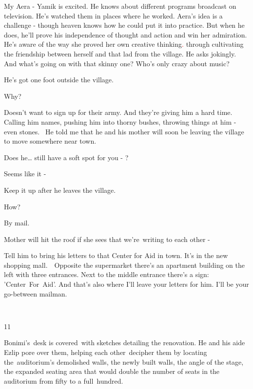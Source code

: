 \documentclass[letterpaper]{article}
\begin{document}
{\textquotedbl}My Aera -{\textquotedbl} Yamik is excited. He knows about different programs broadcast on television.
He's watched them in places where he worked. Aera's idea is a challenge - though heaven knows how he could put it into
practice. But when he does, he'll prove his independence of thought and action and win her admiration. He's aware of
the way she proved her own creative thinking\textcolor{red}{. }through cultivating the friendship between herself and
that lad from the village. He asks jokingly. {\textquotedbl}And what's going on with that skinny one? Who's only crazy
about music?{\textquotedbl} \ 

{\textquotedbl}He's got one foot outside the village.{\textquotedbl} 

{\textquotedbl}Why?{\textquotedbl}

{\textquotedbl}Doesn't want to sign up for their army. And they're giving him a hard time. Calling him names, pushing
him into thorny bushes, throwing things at him - even stones. ~He told me that he and his mother will soon be leaving
the village to move somewhere near town.{\textquotedbl} 

{\textquotedbl}Does he{\dots} still have a soft spot for you - ?{\textquotedbl}

{\textquotedbl}Seems like it -{\textquotedbl} 

{\textquotedbl}Keep it up after he leaves the village.{\textquotedbl} 

{\textquotedbl}How?{\textquotedbl} 

{\textquotedbl}By mail.{\textquotedbl} 

{\textquotedbl}Mother will hit the roof if she sees that we're\ writing to each other -{\textquotedbl} 

{\textquotedbl}Tell him to bring his letters to that Center for Aid in town. It's in the new shopping mall.\ \ Opposite
the supermarket there's an apartment building on the left with three entrances. Next to the middle entrance there's a
sign: 'Center\ For\ Aid'. And that's also where I'll leave your letters for him. I'll be your go-between
mailman.{\textquotedbl} 

~

11 

Bonimi's~desk is covered\textcolor{red}{\ }with sketches detailing the renovation. He and his aide Ezlip pore over them,
helping each other~decipher them by locating the~auditorium's demolished walls, the newly built walls, the angle of the
stage, the expanded seating area that would double the number of seats in the auditorium from fifty to a
full\textcolor{red}{\ }hundred.~ 
\end{document}
